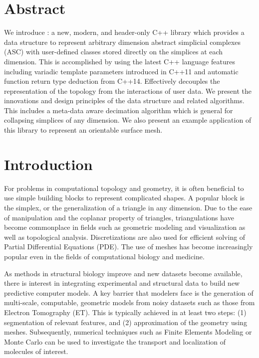 
\section{Abstract}
	We introduce \asc: a new, modern, and header-only C++ library which provides a data structure to represent arbitrary dimension abstract simplicial complexes (ASC) with user-defined classes stored directly on the simplices at each dimension.
  This is accomplished by using the latest C++ language features including variadic template parameters introduced in C++11 and automatic function return type deduction from C++14.
  Effectively \asc decouples the representation of the topology from the interactions of user data.
  We present the innovations and design principles of the data structure and related algorithms.
  This includes a meta-data aware decimation algorithm which is general for collapsing simplices of any dimension.
  We also present an example application of this library to represent an orientable surface mesh.

\section{Introduction}\label{sec:intro}

\par For problems in computational topology and geometry, it is often beneficial to use simple building blocks to represent complicated shapes.
A popular block is the simplex, or the generalization of a triangle in any dimension.
Due to the ease of manipulation and the coplanar property of triangles, triangulations have become commonplace in fields such as geometric modeling and visualization as well as topological analysis.
Discretizations are also used for efficient solving of Partial Differential Equations (PDE).
The use of meshes has become increasingly popular even in the fields of computational biology and medicine\cite{Zhang2016}.

\par As methods in structural biology improve and new datasets become available, there is interest in integrating experimental and structural data to build new predictive computer models\cite{Roberts2014}.
A key barrier that modelers face is the generation of multi-scale, computable, geometric models from noisy datasets such as those from Electron Tomography (ET)\cite{Yu2008a}.
This is typically achieved in at least two steps: (1) segmentation of relevant features, and (2) approximation of the geometry using meshes.
Subsequently, numerical techniques such as Finite Elements Modeling or Monte Carlo can be used to investigate the transport and localization of molecules of interest.

